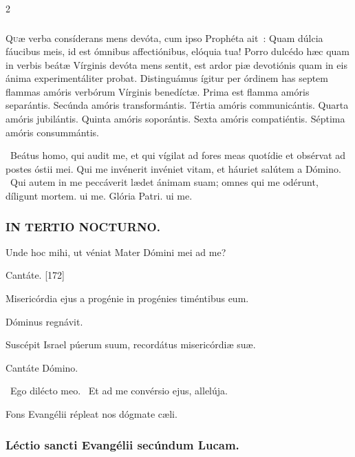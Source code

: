 \documentclass[9pt,twoside]{extarticle}
\begin{document}
\begin{multicols}{2}
\subsubsection*{\center {}}
\lettrine{Q}uæ verba consíderans mens devóta, cum ipso Prophéta ait~: Quam dúlcia fáucibus meis, id est ómnibus affectiónibus, elóquia tua! Porro dulcédo hæc quam in verbis beátæ Vírginis devóta mens sentit, est ardor piæ devotiónis quam in eis ánima experimentáliter probat. Distinguámus ígitur per órdinem has septem flammas amóris verbórum Vírginis benedíctæ. Prima est flamma amóris separántis. Secúnda amóris transformántis. Tértia amóris communicántis. Quarta amóris jubilántis. Quinta amóris soporántis. Sexta amóris compatiéntis. Séptima amóris consummántis.

\begin{tightlist}{}
\item {}~Beátus homo, qui audit me, et qui vígilat ad fores meas quotídie et obsérvat ad postes óstii mei. \textred{*} Qui me invénerit invéniet vitam, et háuriet salútem a Dómino. ~Qui autem in me peccáverit lædet ánimam suam; omnes qui me odérunt, díligunt mortem. ui me. Glória Patri. ui me.
\end{tightlist}

\subsubsection*{\center \textsc{IN TERTIO NOCTURNO.}}
\begin{tightlist}{}
\item {} Unde hoc mihi, ut véniat Mater Dómini mei ad me?
\item {} Cantáte. [172]
\item {} Misericórdia ejus a progénie in progénies timéntibus eum.
\item {} Dóminus regnávit.
\item {} Suscépit Israel púerum suum, recordátus misericórdiæ suæ.
\item {} Cantáte Dómino.
\item {}~Ego dilécto meo. ~Et ad me convérsio ejus, allelúja.
\item {} Fons Evangélii répleat nos dógmate cæli.
\end{tightlist}

\subsubsection*{\center Léctio sancti Evangélii secúndum Lucam.}

\end{multicols}
\end{document}
